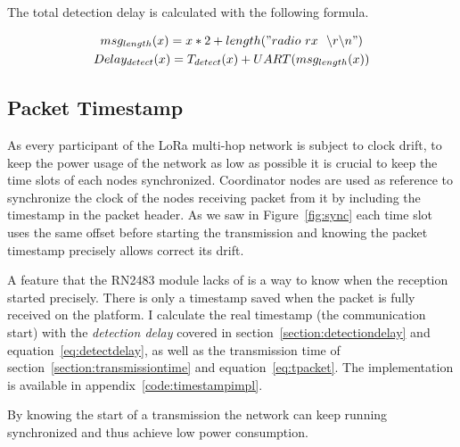 The total detection delay is calculated with the following formula.

\begin{gather}
  msg_{length}(x) = x * 2 + length("radio~rx~~\backslash r \backslash n") \\
  \label{eq:detectdelay}
  Delay_{detect}(x) = T_{detect}(x) + UART(msg_{length}(x))
\end{gather}

\subsection{Packet Timestamp}

As every participant of the LoRa multi-hop network is subject to clock drift,
to keep the power usage of the network as low as possible it is
crucial to keep the time slots of each nodes synchronized.
Coordinator nodes are used as reference to synchronize the clock of the nodes
receiving packet from it by including the timestamp in the packet header.
As we saw in Figure~\ref{fig:sync} each time slot uses the same offset before
starting the transmission and knowing the packet timestamp precisely allows
correct its drift.

A feature that the RN2483 module lacks of is a way to know when the reception started
precisely.
There is only a timestamp saved when the packet is fully received on the platform.
I calculate the real timestamp (the communication start) with the
\emph{detection delay} covered in section~\ref{section:detectiondelay} and
equation~\ref{eq:detectdelay}, as well as the transmission time of
section~\ref{section:transmissiontime} and equation~\ref{eq:tpacket}.
The implementation is available in appendix~\ref{code:timestampimpl}.

By knowing the start of a transmission the network can keep running synchronized
and thus achieve low power consumption.



